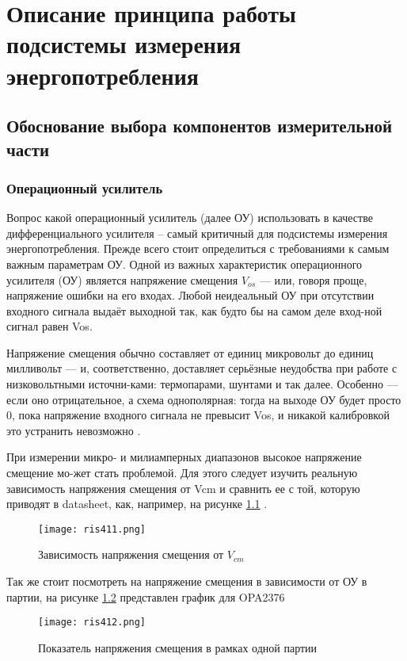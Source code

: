 \chapter{Описание принципа работы подсистемы измерения энергопотребления}
\section{Обоснование выбора компонентов измерительной части}
\subsection{Операционный усилитель}
\hspace{1cm} 

Вопрос какой операционный усилитель (далее ОУ) использовать в качестве дифференциального усилителя -- самый 
критичный для подсистемы измерения энергопотребления. Прежде всего стоит определиться с требованиями к 
самым важным параметрам ОУ. 
Одной из важных характеристик операционного усилителя (ОУ) является напряжение смещения $V_{os}$ — или, 
говоря проще, напряжение ошибки на его входах. Любой неидеальный ОУ при отсутствии входного сигнала выдаёт 
выходной так, как будто бы на самом деле вход-ной сигнал равен Vos.

Напряжение смещения обычно составляет от единиц микровольт до единиц милливольт — и, соответственно, 
доставляет серьёзные неудобства при работе с низковольтными источни-ками: термопарами, шунтами и так далее.
Особенно — если оно отрицательное, а схема однополярная: тогда на выходе ОУ будет просто 0, пока 
напряжение входного сигнала не превысит Vos, и никакой калибровкой это устранить невозможно \cite{Chopper:OU} 
\cite{MT-037:Tutorial}. 

При измерении микро- и милиамперных диапазонов высокое напряжение смещение мо-жет стать проблемой.
Для этого следует изучить реальную зависимость напряжения смещения от Vcm и сравнить ее с той, 
которую приводят в datasheet, как, например, на рисунке \ref{ris:411} \cite{OPAx376:datasheet}.
\begin{figure}[H]
\centering
\texttt{[image: ris411.png]}
\caption{Зависимость напряжения смещения от $V_{cm}$}
\label{ris:411}
\end{figure}

Так же стоит посмотреть на напряжение смещения в зависимости от ОУ в партии, 
на рисунке \ref{ris:412} представлен график для OPA2376 \cite{OPAx376:datasheet}

\begin{figure}[H]
\centering
\texttt{[image: ris412.png]}
\caption{Показатель напряжения смещения в рамках одной партии}
\label{ris:412}
\end{figure}

